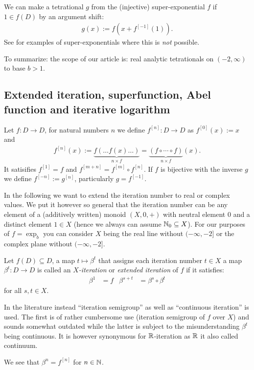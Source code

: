 \documentclass{article}
\numberwithin{equation}{section}
\begin{document}
We can make a tetrational $g$ from the (injective) super-exponential $f$
if $1\in f(D)$ by an argument shift:
 \begin{align*}g(x):=f(x+f^{[-1]}(1)).\end{align*} 
See \cite{Kouznetsov:sqrt2} for examples of super-exponentials where this is {\em not} possible.

To summarize: the scope of our article is: real analytic tetrationals on
$(-2,\infty)$ to base $b>1$.


\subsection{Extended iteration, superfunction, Abel function and iterative logarithm}
\begin{definition}[$f^{[n]}$,$f^{[-1]}$]
  Let $f\colon D\to D$, for natural numbers $n$ we define
  $f^{[n]}\colon D\to D$ as $f^{[0]}(x):=x$ and
  \begin{align*}
    f^{[n]}(x) := \underbrace{f(\dotso f(x)\dotso)}_{n \times f} =
    \underbrace{(f\circ\dotsm\circ f)}_{n\times f}(x).
  \end{align*}
  It satisifies $f^{[1]}=f$ and $f^{[m+n]}=f^{[m]}\circ f^{[n]}$.
  If $f$ is bijective with the inverse $g$ we define $f^{[-n]} :=
  g^{[n]}$, particularly $g=f^{[-1]}$.
\end{definition}
In the following we want to extend the iteration number to real or
complex values. We put it however so general that the iteration number
can be any element of a (additively written) monoid $(X,0,+)$ with
neutral element 0 and a distinct element $1\in X$ (hence we always can
assume $\mathbb{N}_0\subseteq X$). For our purposes of $f=\exp_b$ you can consider $X$ being the
real line without $(-\infty,-2]$ or the complex plane without $(-\infty,-2]$.

\begin{definition}
  \label{def:extended_iteration}
  Let $f(D)\subseteq D$, a map $t\mapsto \beta^t$ that assigns
  each iteration number $t\in X$ a map $\beta^t\colon D\to D$ is
  called an {\em $X$-iteration} or {\em extended iteration} of $f$ if it satisfies:  
  \begin{align}
    \beta^{1}&=f & \beta^{s+t}&=\beta^s\circ \beta^t
  \end{align}
  for all $s,t\in X$.

  In the literature instead ``iteration semigroup'' as well as ``continuous
  iteration''  is used. The first is of rather cumbersome use
  (iteration semigroup of $f$ over $X$) and sounds somewhat outdated
  while the latter is subject to the misunderstanding $\beta^t$ being
  continuous. It is however synonymous for $\mathbb{R}$-iteration as $\mathbb{R}$ it
  also called continuum. 
\end{definition}
We see that $\beta^{n} = f^{[n]}$ for $n\in\mathbb{N}$.
\end{document}
